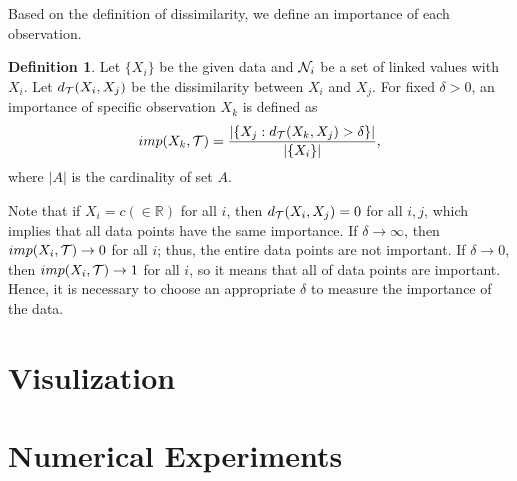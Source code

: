 \documentclass[preprint, review, 12pt]{article}
\theoremstyle{definition}
\newtheorem{dfn}{Definition}
\theoremstyle{remark}
\begin{document}
Based on the definition of dissimilarity, we define an importance of each observation.

\begin{dfn}
	Let $\{X_i\}$ be the given data and ${\cal N}_{i}$ be a set of linked values with $X_i$. Let $d_{\cal T}(X_i,X_j)$ be the dissimilarity between $X_i$ and $X_j$. For fixed $\delta>0$, an importance of specific observation $X_{k}$ is defined as 
	\[
	imp(X_{k},{\cal T})=\frac{\left|\{X_{j}:d_{\cal T}(X_{k},X_{j})>\delta\}\right|}{\left|\{X_i\}\right|}, 
	\]
	where $|A|$ is the cardinality of set $A$. 
\end{dfn}

Note that if $X_i=c(\in \mathbb{R})$ for all $i$, then $d_{\cal T}(X_i,X_j)=0$ for all $i,j$, which implies that all data points have the same importance. If $\delta \to \infty$, then $imp(X_i,{\cal T}) \to 0$ for all $i$; thus, the entire data points are not important. If $\delta \to 0$, then $imp(X_i,{\cal T}) \to 1$ for all $i$, so it means that all of data points are important. Hence, it is necessary to choose an  appropriate $\delta$ to measure the importance of the data. 
\fi 
\section{Visulization}

\section{Numerical Experiments}
\end{document}
